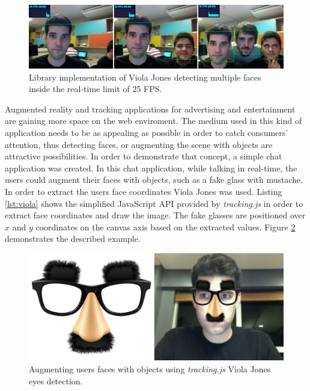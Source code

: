 \begin{figure}[!htb]
  \centering
  \includegraphics[width=\linewidth]{chapters/evaluation/viola.png}
  \caption{Library implementation of Viola Jones detecting multiple faces inside the real-time limit of 25 FPS.}
  \label{figure:viola_multiple_faces}
\end{figure}

Augmented reality and tracking applications for advertising and entertainment are gaining more space on the web enviroment. The medium used in this kind of application needs to be as appealing as possible in order to catch consumers' attention, thus detecting faces, or augmenting the scene with objects are attractive possibilities. In order to demonstrate that concept, a simple chat application was created. In this chat application, while talking in real-time, the users could augment their faces with objects, such as a fake glass with mustache. In order to extract the users face coordinates Viola Jones was used. Listing \ref{lst:viola} shows the simplified JavaScript API provided by \textit{tracking.js} in order to extract face coordinates and draw the image. The fake glasses are positioned over $x$ and $y$ coordinates on the canvas axis based on the extracted values. Figure \ref{figure:viola_glass_face} demonstrates the described example.

\begin{figure}[!htb]
  \centering
  \includegraphics[width=380pt]{chapters/evaluation/viola_glass_face.png}
  \caption{Augmenting users faces with objects using \textit{tracking.js} Viola Jones eyes detection.}
  \label{figure:viola_glass_face}
\end{figure}

